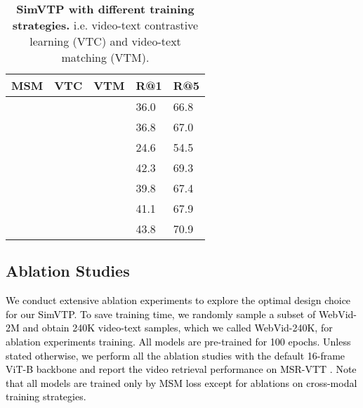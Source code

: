 \documentclass[10pt,twocolumn,letterpaper]{article}
\newcommand{\yty}[1]{\textcolor{black}{#1}}
\begin{document}
\begin{table}[]
	\centering
	\begin{tabular}{lllll}
		\toprule
		MSM & VTC & VTM  &   R@1       &   R@5        \\
		\midrule
		\textcolor{darkergreen}{\Checkmark}      &   \XSolidBrush    & \XSolidBrush           & 36.0          & 66.8         \\
		\XSolidBrush    & \textcolor{darkergreen}{\Checkmark}      & \XSolidBrush              & 36.8    & 67.0             \\
		\XSolidBrush    & \XSolidBrush      & \textcolor{darkergreen}{\Checkmark}             &  24.6    & 54.5             \\
		\textcolor{darkergreen}{\Checkmark}      & \textcolor{darkergreen}{\Checkmark}        & \XSolidBrush              & 42.3    &   69.3              \\
		\textcolor{darkergreen}{\Checkmark}      & \XSolidBrush      & \textcolor{darkergreen}{\Checkmark}            &   39.8     &   67.4          \\
		\XSolidBrush    & \textcolor{darkergreen}{\Checkmark}       & \textcolor{darkergreen}{\Checkmark}             &  41.1     &   67.9           \\
		\textcolor{darkergreen}{\Checkmark}      & \textcolor{darkergreen}{\Checkmark}        & \textcolor{darkergreen}{\Checkmark}             &  43.8     & 70.9          \\
		\bottomrule
	\end{tabular}
	\caption{\textbf{SimVTP with different training strategies.} i.e. video-text contrastive learning (VTC) and video-text matching (VTM).}\label{tb:loss}
	\vspace{-0.5cm}
\end{table}

\subsection{Ablation Studies}\label{ablation}
\yty{We conduct extensive ablation experiments to explore the optimal design choice for our SimVTP. To save training time, we randomly sample a subset of WebVid-2M \cite{bain2021frozen} and obtain 240K video-text samples, which we called WebVid-240K, for ablation experiments training. All models are pre-trained for 100 epochs. Unless stated otherwise, we perform all the ablation studies with the default 16-frame ViT-B backbone and report the video retrieval performance on MSR-VTT \cite{xu2016msr}. Note that all models are trained only by MSM loss except for ablations on cross-modal training strategies.}
\end{document}

